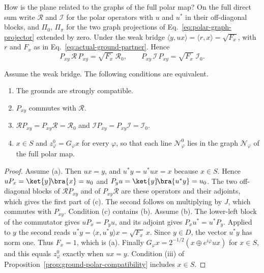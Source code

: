 How is the plane related to the graphs of the full polar map? On the full direct sum write $\mathcal R$ and $\mathcal I$ for the polar operators with $u$ and $u^*$ in their off-diagonal blocks, and $\Pi_0$, $\Pi_\pi$ for the two graph projections of Eq.~\eqref{eq:polar-graph-projector} extended by zero. Under the weak bridge $\langle y,ux\rangle=\langle r,x\rangle=\sqrt{F_x}$, with $r$ and $F_x$ as in Eq.~\eqref{eq:actual-ground-partner}. Hence
\begin{equation}
 P_{xy}\,\mathcal R\,P_{xy}=\sqrt{F_x}\;\mathcal R_0,\qquad
 P_{xy}\,\mathcal I\,P_{xy}=\sqrt{F_x}\;\mathcal I_0 .
 \label{eq:ground-plane-compression}
\end{equation}

\begin{proposition}
\label{prop:ground-plane-reduction}
Assume the weak bridge. The following conditions are equivalent.
\begin{enumerate}
\item[(a)] The grounds are strongly compatible.
\item[(b)] $P_{xy}$ commutes with $\mathcal R$.
\item[(c)] $\mathcal RP_{xy}=P_{xy}\mathcal R=\mathcal R_0$ and $\mathcal IP_{xy}=P_{xy}\mathcal I=\mathcal I_0$.
\item[(d)] $x\in S$ and $z^0_\varphi=G_\varphi x$ for every $\varphi$, so that each line $\mathcal N^0_\varphi$ lies in the graph $\mathcal N_\varphi$ of the full polar map.
\end{enumerate}
\end{proposition}
\begin{proof}
Assume (a). Then $ux=y$, and $u^*y=u^*ux=x$ because $x\in S$. Hence $uP_x=\ket{y}\!\bra{x}=u_0$ and $P_yu=\ket{y}\!\bra{u^*y}=u_0$. The two off-diagonal blocks of $\mathcal RP_{xy}$ and of $P_{xy}\mathcal R$ are these operators and their adjoints, which gives the first part of (c). The second follows on multiplying by $J$, which commutes with $P_{xy}$. Condition (c) contains (b). Assume (b). The lower-left block of the commutator gives $uP_x=P_yu$, and its adjoint gives $P_xu^*=u^*P_y$. Applied to $y$ the second reads $u^*y=\langle x,u^*y\rangle x=\sqrt{F_x}\,x$. Since $y\in D$, the vector $u^*y$ has norm one. Thus $F_x=1$, which is (a). Finally $G_\varphi x=2^{-1/2}(x\oplus e^{i\varphi}ux)$ for $x\in S$, and this equals $z^0_\varphi$ exactly when $ux=y$. Condition (iii) of Proposition~\ref{prop:ground-polar-compatibility} includes $x\in S$.
\end{proof}

